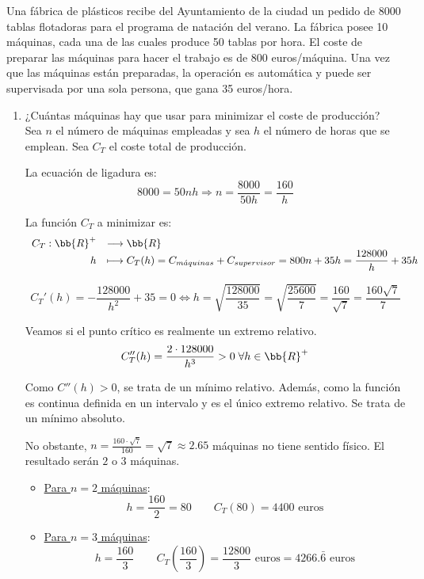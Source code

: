 \begin{ejercicio}
    Una fábrica de plásticos recibe del Ayuntamiento de la ciudad un pedido de 8000 tablas flotadoras para el programa de natación del verano. La fábrica posee 10 máquinas, cada una de las cuales produce 50 tablas por hora. El coste de preparar las máquinas para hacer el trabajo es de 800 euros/máquina. Una vez que las máquinas están preparadas, la operación es automática y puede ser supervisada por una sola persona, que gana 35 euros/hora.
    \begin{enumerate}
        \item ¿Cuántas máquinas hay que usar para minimizar el coste de producción?\\

        Sea $n$ el número de máquinas empleadas y sea $h$ el número de horas que se emplean. Sea $C_T$ el coste total de producción.

        La ecuación de ligadura es:
        $$8000 = 50nh \Longrightarrow n=\frac{8000}{50h} = \frac{160}{h}$$

        La función $C_T$ a minimizar es:
        \begin{equation*}
            \begin{array}{rl}
                C_T:\bb{R}^+ & \longrightarrow \bb{R}\\
                        h & \longmapsto C_T(h)=C_{m\acute{a}quinas} + C_{supervisor} = 800n + 35h = \displaystyle \frac{128000}{h} + 35h
            \end{array}
        \end{equation*}

        \begin{equation*}
            C_T'(h) = -\frac{128000}{h^2} + 35 = 0\Longleftrightarrow h=\sqrt{\frac{128000}{35}} = \sqrt{\frac{25600}{7}} = \frac{160}{\sqrt{7}} = \frac{160\sqrt{7}}{7}
        \end{equation*}

        Veamos si el punto crítico es realmente un extremo relativo.
        \begin{equation*}
            C_T''(h) = \frac{2\cdot 128000}{h^3} > 0 \; \forall h\in \bb{R}^+
        \end{equation*}

        Como $C''(h)>0$, se trata de un mínimo relativo. Además, como la función es continua definida en un intervalo y es el único extremo relativo. Se trata de un mínimo absoluto.

        No obstante, $n=\frac{160 \cdot \sqrt{7}}{160} = \sqrt{7} \approx 2.65$ máquinas no tiene sentido físico. El resultado serán $2$ o $3$ máquinas.
        \begin{itemize}
            \item \underline{Para $n=2$ máquinas}:
            $$h=\frac{160}{2} = 80\qquad C_T(80) = 4400\text{ euros}$$
            \item \underline{Para $n=3$ máquinas}:
            $$h=\frac{160}{3} \qquad C_T\left(\frac{160}{3}\right) = \frac{12800}{3}\text{ euros} = 4266.\bar{6}\text{ euros}$$
        \end{itemize}


\end{enumerate}
\end{ejercicio}
